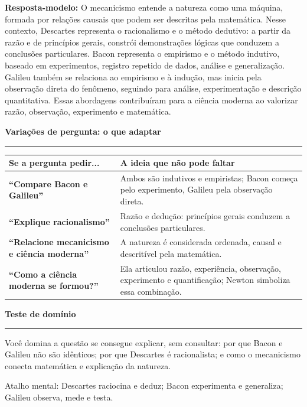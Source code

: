 \documentclass[10pt,a4paper]{article}
\newcommand{\secao}[1]{\vspace{0.75em}\noindent\textcolor{azul}{\Large\textbf{#1}}\par\vspace{0.18em}\hrule\vspace{0.32em}}
\begin{document}
\textbf{Resposta-modelo:} O mecanicismo entende a natureza como uma máquina, formada por relações causais que podem ser descritas pela matemática. Nesse contexto, Descartes representa o racionalismo e o método dedutivo: a partir da razão e de princípios gerais, constrói demonstrações lógicas que conduzem a conclusões particulares. Bacon representa o empirismo e o método indutivo, baseado em experimentos, registro repetido de dados, análise e generalização. Galileu também se relaciona ao empirismo e à indução, mas inicia pela observação direta do fenômeno, seguindo para análise, experimentação e descrição quantitativa. Essas abordagens contribuíram para a ciência moderna ao valorizar razão, observação, experimento e matemática.

\secao{Variações de pergunta: o que adaptar}

\begin{tabularx}{\linewidth}{>{\bfseries}p{5cm}X}
\hline
\rowcolor{azulclaro}Se a pergunta pedir... & A ideia que não pode faltar \\
\hline
``Compare Bacon e Galileu'' & Ambos são indutivos e empiristas; Bacon começa pelo experimento, Galileu pela observação direta. \\
``Explique racionalismo'' & Razão e dedução: princípios gerais conduzem a conclusões particulares. \\
``Relacione mecanicismo e ciência moderna'' & A natureza é considerada ordenada, causal e descritível pela matemática. \\
``Como a ciência moderna se formou?'' & Ela articulou razão, experiência, observação, experimento e quantificação; Newton simboliza essa combinação. \\
\hline
\end{tabularx}

\secao{Teste de domínio}

Você domina a questão se consegue explicar, sem consultar: por que Bacon e Galileu não são idênticos; por que Descartes é racionalista; e como o mecanicismo conecta matemática e explicação da natureza.

\vfill
\small\textcolor{azul}{Atalho mental: Descartes raciocina e deduz; Bacon experimenta e generaliza; Galileu observa, mede e testa.}
\end{document}
